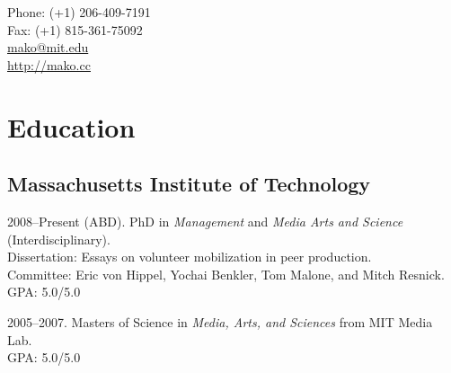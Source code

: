 \documentclass[11pt]{article}
\makeatletter
\def\myemail{mako@mit.edu}
\def\myweb{http://mako.cc}
\def\myphone{(+1) 206-409-7191}
\def\myfax{(+1) 815-361-75092}
\newenvironment{cvlist}{
\begin{list}{}{\leftmargin=3.0em \itemindent=-3.0em}
  \setlength{\itemsep}{0pt}
  \setlength{\parskip}{0em}
  \setlength{\parsep}{1em}
  \setlength{\parindent}{0em}}
{\vspace{1em}
\end{list}}
\makeatother
\begin{document}
\pagestyle{fancy}
\renewcommand{\headrulewidth}{0pt}
\fancyhead{}
\fancyfoot{}
\rhead{{\scriptsize\thepage}}


\begin{minipage}[t]{3in}
  
\end{minipage}
\hfill     
\begin{minipage}[t]{0.0in}
\end{minipage}
\hfill
\begin{minipage}[t]{1.7in}
  \flushright \footnotesize Phone: \myphone \\ 
  Fax: \myfax \\ 
  {\scriptsize \href{mailto:\myemail}{\myemail}} \\
  {\scriptsize  \href{\myweb}{\myweb}}
\end{minipage}

\medskip


\medskip

\section{Education}

\subsection{Massachusetts Institute of Technology}
\begin{cvlist}

\item 2008--Present (ABD). PhD in \emph{Management} and \emph{Media
    Arts and Science} (Interdisciplinary). \\
  Dissertation: Essays on volunteer mobilization in peer production. \\
  Committee: Eric von Hippel, Yochai Benkler, Tom Malone, and
  Mitch Resnick. \\
 GPA: 5.0/5.0 \\
\item 2005--2007. Masters of Science in \emph{Media, Arts, and
    Sciences} from MIT Media Lab.\\ GPA: 5.0/5.0

\end{cvlist}
\end{document}
